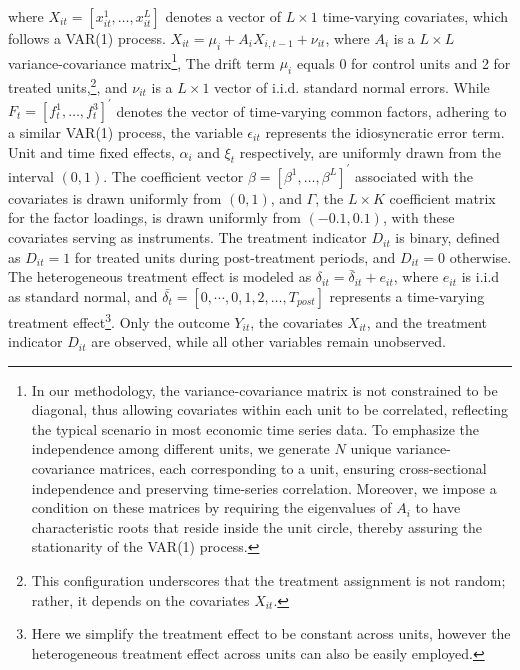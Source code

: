 \documentclass[12pt]{article}
\begin{document}
\noindent where $X_{it} = [x_{it}^1, \ldots, x_{it}^{L}]$ denotes a vector of $L \times 1$ time-varying covariates, which follows a VAR(1) process. $X_{it} = \mu_i + A_i X_{i,t-1} + \nu_{it}$, where $A_i$ is a $ L \times L$ variance-covariance matrix\footnote{In our methodology, the variance-covariance matrix is not constrained to be diagonal, thus allowing covariates within each unit to be correlated, reflecting the typical scenario in most economic time series data. To emphasize the independence among different units, we generate $N$ unique variance-covariance matrices, each corresponding to a unit, ensuring cross-sectional independence and preserving time-series correlation. Moreover, we impose a condition on these matrices by requiring the eigenvalues of $A_i$ to have characteristic roots that reside inside the unit circle, thereby assuring the stationarity of the VAR(1) process.}, The drift term $\mu_i$ equals 0 for control units and 2 for treated units,\footnote{This configuration underscores that the treatment assignment is not random; rather, it depends on the covariates $X_{it}$.}, and $\nu_{it}$ is a $L \times 1$ vector of i.i.d. standard normal errors. While $F_t = [f_t^1, \ldots, f_t^3]^\prime$ denotes the vector of time-varying common factors, adhering to a similar VAR(1) process, the variable $\epsilon_{it}$ represents the idiosyncratic error term. Unit and time fixed effects, $\alpha_i$ and $\xi_{t}$ respectively, are uniformly drawn from the interval $(0,1)$. The coefficient vector $\beta = [\beta^1, \ldots, \beta^{L}]^\prime$ associated with the covariates is drawn uniformly from $(0,1)$, and $\Gamma$, the $L \times K$ coefficient matrix for the factor loadings, is drawn uniformly from $(-0.1, 0.1)$, with these covariates serving as instruments. The treatment indicator $D_{it}$ is binary, defined as $D_{it} = 1$ for treated units during post-treatment periods, and $D_{it} = 0$ otherwise. The heterogeneous treatment effect is modeled as $\delta_{it} = \bar{\delta}_{it} + e_{it}$, where $e_{it}$ is i.i.d as standard normal, and $\bar{\delta_t} = [0, \cdots, 0, 1,2,\ldots,T_{post}]$ represents a time-varying treatment effect\footnote{Here we simplify the treatment effect to be constant across units, however the heterogeneous treatment effect across units can also be easily employed.}. Only the outcome $Y_{it}$, the covariates $X_{it}$, and the treatment indicator $D_{it}$ are observed, while all other variables remain unobserved.
\end{document}
